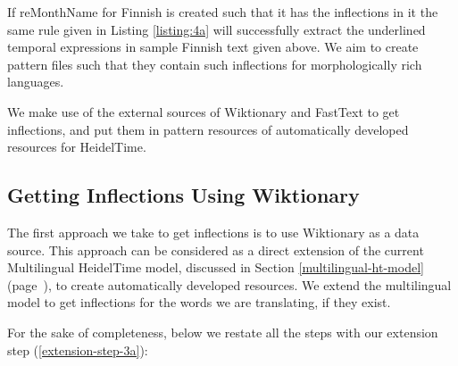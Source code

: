 If reMonthName for Finnish is created such that it has the inflections in it the same rule given in Listing \ref{listing:4a} will successfully extract the underlined temporal expressions in sample Finnish text given above. We aim to create pattern files such that they contain such inflections for morphologically rich languages. 

We make use of the external sources of Wiktionary and FastText to get inflections, and put them in pattern resources of automatically developed resources for HeidelTime. 

\subsection{Getting Inflections Using Wiktionary} \label{sec4b1}
The first approach we take to get inflections is to use Wiktionary as a data source. This approach can be considered as a direct extension of the current Multilingual HeidelTime model, discussed in Section \ref{multilingual-ht-model} (page~\pageref{multilingual-ht-model}), to create automatically developed resources. We extend the multilingual model to get inflections for the words we are translating, if they exist. 

For the sake of completeness, below we restate all the steps with our extension step (\ref{extension-step-3a}):


